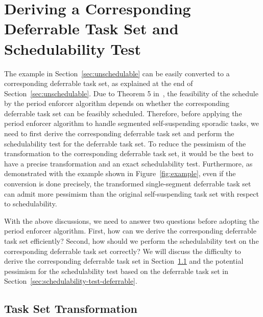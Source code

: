 
\section{Deriving a Corresponding Deferrable Task Set and Schedulability Test}
\label{sec:convert}

The example in Section~\ref{sec:unschedulable} can be easily converted to a corresponding deferrable task set, as explained at the end of Section~\ref{sec:unschedulable}.  Due to Theorem 5 in~\cite{Raj:suspension1991}, the feasibility of the schedule by the period enforcer algorithm depends on whether the corresponding deferrable task set can be feasibly scheduled. Therefore, before applying the period enforcer algorithm to handle segmented self-suspending sporadic tasks, we need to first derive the corresponding deferrable task set and perform the schedulability test for the deferrable task set. To reduce the pessimism of the transformation to the corresponding deferrable task set, it would be the best to have a precise transformation and an exact schedulability test. Furthermore, as demonstrated with the example shown in Figure~\ref{fig:example}, even if the conversion is done precisely, the transformed single-segment deferrable task set can admit more pessimism than the original self-suspending task set with respect to schedulability.


With the above discussions, we need to answer two questions before adopting the period enforcer algorithm. First, how can we derive the corresponding deferrable task set efficiently? Second, how should we perform the schedulability test on the corresponding deferrable task set correctly? We will discuss the difficulty to derive the corresponding deferrable task set in Section~\ref{sec:transformation-exponential} and the potential pessimism for the schedulability test based on the deferrable task set in Section~\ref{sec:schedulability-test-deferrable}.

\subsection{Task Set Transformation}
\label{sec:transformation-exponential}

